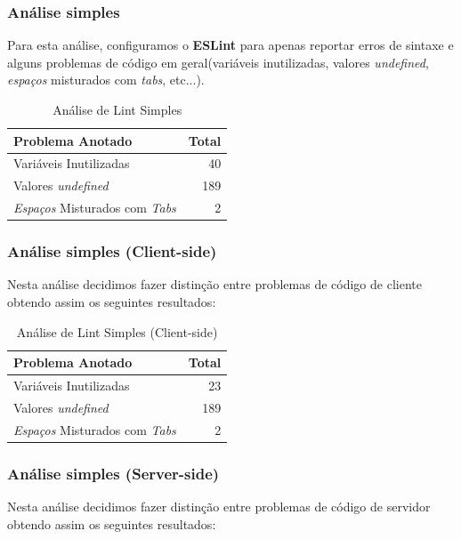 \documentclass[a4paper,12pt]{article} %
\begin{document}
\subsubsection{Análise simples}
Para esta análise, configuramos o \textbf{ESLint} para apenas reportar erros de sintaxe e alguns problemas de código em geral(variáveis inutilizadas, valores \textit{undefined}, \textit{espaços} misturados com \textit{tabs}, etc...).

\vspace{1cm}
\begin{table}[H]
	\centering
	\begin{tabular}{|l|r|}
		\hline
		\textbf{Problema Anotado} & \textbf{Total} \\
		\hline
		Variáveis Inutilizadas & 40 \\
		\hline
		Valores \textit{undefined} & 189 \\
		\hline
		\textit{Espaços} Misturados com \textit{Tabs} & 2 \\
		\hline
	\end{tabular}
	\caption{Análise de Lint Simples}
\end{table}

\subsubsection{Análise simples (Client-side)}
Nesta análise decidimos fazer distinção entre problemas de código de cliente obtendo assim os seguintes resultados:

\vspace{1cm}
\begin{table}[H]
	\centering
	\begin{tabular}{|l|r|}
		\hline
		\textbf{Problema Anotado} & \textbf{Total} \\
		\hline
		Variáveis Inutilizadas & 23 \\
		\hline
		Valores \textit{undefined} & 189 \\
		\hline
		\textit{Espaços} Misturados com \textit{Tabs} & 2 \\
		\hline
	\end{tabular}
	\caption{Análise de Lint Simples (Client-side)}
\end{table}

\newpage
\subsubsection{Análise simples (Server-side)}
Nesta análise decidimos fazer distinção entre problemas de código de servidor obtendo assim os seguintes resultados:
\end{document}
